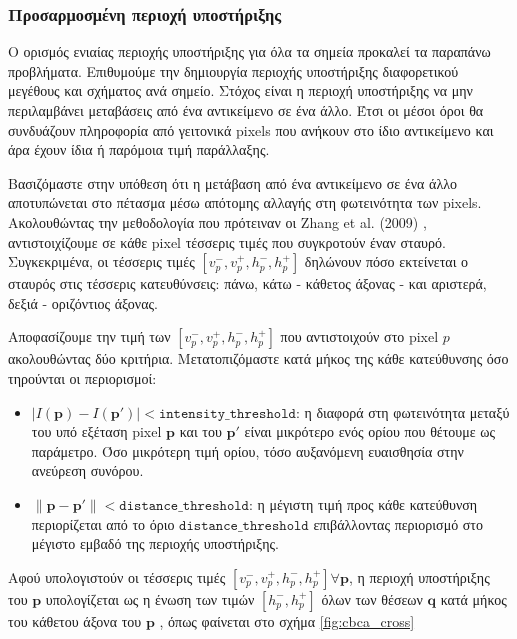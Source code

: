 \subsubsection{Προσαρμοσμένη περιοχή υποστήριξης}

Ο ορισμός ενιαίας περιοχής υποστήριξης για όλα τα σημεία προκαλεί τα παραπάνω προβλήματα. Επιθυμούμε την δημιουργία περιοχής υποστήριξης διαφορετικού μεγέθους και σχήματος ανά σημείο. Στόχος είναι η περιοχή υποστήριξης να μην περιλαμβάνει μεταβάσεις από ένα αντικείμενο σε ένα άλλο. Έτσι οι μέσοι όροι θα συνδυάζουν πληροφορία από γειτονικά \e pixels \g που ανήκουν στο ίδιο αντικείμενο και άρα έχουν ίδια ή παρόμοια τιμή παράλλαξης. 

Βασιζόμαστε στην υπόθεση ότι η μετάβαση από ένα αντικείμενο σε ένα άλλο αποτυπώνεται στο πέτασμα μέσω απότομης αλλαγής στη φωτεινότητα των \e pixels. \g \citep{lu2008anisotropic} Ακολουθώντας την μεθοδολογία που πρότειναν οι \e Zhang et al. (2009) \g \cite{zhang2009cross}, αντιστοιχίζουμε σε κάθε \e pixel \g τέσσερις τιμές που συγκροτούν έναν σταυρό. Συγκεκριμένα, οι τέσσερις τιμές $[v_{p}^-, v_{p}^+, h_{p}^-, h_{p}^+]$ δηλώνουν πόσο εκτείνεται ο σταυρός στις τέσσερις κατευθύνσεις: πάνω, κάτω - κάθετος άξονας - και αριστερά, δεξιά - οριζόντιος άξονας.

Αποφασίζουμε την τιμή των $[v_{p}^-, v_{p}^+, h_{p}^-, h_{p}^+]$ που αντιστοιχούν στο \e pixel \g $p$ ακολουθώντας δύο κριτήρια. Μετατοπιζόμαστε κατά μήκος της κάθε κατεύθυνσης όσο τηρούνται οι περιορισμοί: 

\begin{itemize}
	\item \e $|I(\mathbf{p}) - I(\mathbf{p'})| < \texttt{intensity\_threshold}$: \g η διαφορά στη φωτεινότητα μεταξύ του υπό εξέταση \e pixel \g $\mathbf{p}$ και του $\mathbf{p'}$ είναι μικρότερο ενός ορίου που θέτουμε ως παράμετρο. Όσο μικρότερη τιμή ορίου, τόσο αυξανόμενη ευαισθησία στην ανεύρεση συνόρου.			
	\item \e $\|\mathbf{p} - \mathbf{p'}\| < \texttt{distance\_threshold}$: \g η μέγιστη τιμή προς κάθε κατεύθυνση περιορίζεται από το όριο  \e $\texttt{distance\_threshold}$ \g επιβάλλοντας περιορισμό στο μέγιστο εμβαδό της περιοχής υποστήριξης.
\end{itemize}

Αφού υπολογιστούν οι τέσσερις τιμές \e $[v_{p}^-, v_{p}^+, h_{p}^-, h_{p}^+]  \forall \mathbf{p}$\g, η περιοχή υποστήριξης του \e$\mathbf{p}$ \g υπολογίζεται ως η ένωση των τιμών $[h_{p}^-, h_{p}^+]$ όλων των θέσεων \e$\mathbf{q}$ \g κατά μήκος του κάθετου άξονα του \e $\mathbf{p}$ \g, όπως φαίνεται στο σχήμα \ref{fig:cbca_cross}

